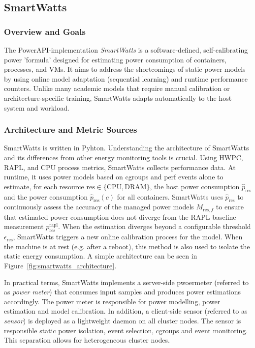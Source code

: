 \subsection{SmartWatts}
\label{sec:smartwatts}
\subsubsection{Overview and Goals}
\label{sec:smartwatts-overview}
The PowerAPI-implementation \textit{SmartWatts}\parencite{fieni2020smartwatts} is a software-defined, self-calibrating power 'formula' designed for estimating power consumption of containers, processes, and VMs. It aims to address the shortcomings of static power models by using online model adaptation (sequential learning) and runtime performance counters. Unlike many academic models that require manual calibration or architecture-specific training, SmartWatts adapts automatically to the host system and workload.
\subsubsection{Architecture and Metric Sources}
\label{sec:smartwatts-architecture}
SmartWatts is written in Pyhton. Understanding the architecture of SmartWatts and its differences from other energy monitoring tools is crucial. Using HWPC, RAPL, and CPU process metrics, SmartWatts collects performance data. At runtime, it uses power models based on cgroups and perf events alone to estimate, for each resource $\text{res} \in \{\text{CPU}, \text{DRAM}\}$, the host power consumption $\hat{p}_{\text{res}}$ and the power consumption $\hat{p}_{\text{res}}(c)$ for all containers. SmartWatts uses $\hat{p}_{\text{res}}$ to continuously assess the accuracy of the managed power models $M_{\text{res}, f}$ to ensure that estimated power consumption does not diverge from the RAPL baseline measurement $p_{\text{res}}^{\text{rapl}}$. When the estimation diverges beyond a configurable threshold $\epsilon_{\text{res}}$, SmartWatts triggers a new online calibration process for the model. When the machine is at rest (e.g. after a reboot), this method is also used to isolate the static energy consumption. A simple architecture can be seen in Figure~\ref{fig:smartwatts_architecture}.

In practical terms, SmartWatts implements a server-side pwoermeter (referred to as \textit{power meter}) that consumes input samples and produces power estimations accordingly. The power meter is responsible for power modelling, power estimation and model calibration. In addition, a client-side sensor (referred to as \textit{sensor}) is deployed as a lightweight daemon on all cluster nodes. The sensor is responsible static power isolation, event selection, cgroups and event monitoring. This separation allows for heterogeneous cluster nodes.

